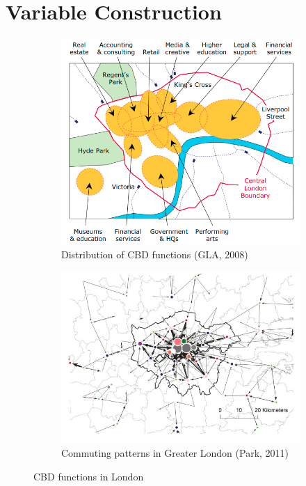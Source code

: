\documentclass{article}
\begin{document}
\section{Variable Construction} \label{section:variables}
\begin{figure}[t]
\begin{subfigure}{.5\textwidth}
  \centering
  \includegraphics[width=.9\linewidth]{images/cbd.png}
\caption{Distribution of CBD functions (GLA, 2008)}
  \label{fig:cbd}
\end{subfigure}%
\begin{subfigure}{.5\textwidth}
  \centering
  \includegraphics[width=.9\linewidth]{images/park2011.png}
  \caption{Commuting patterns in Greater London (Park, 2011)}
  \label{fig:park2011}
\end{subfigure}
\caption{CBD functions in London}
\label{fig:2}
\end{figure}
\end{document}
